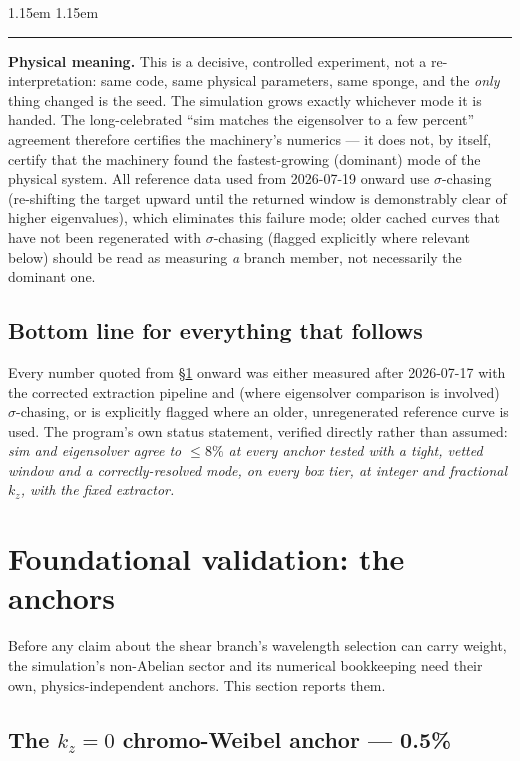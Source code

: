 \documentclass[11pt,a4paper]{article}
\numberwithin{equation}{section}
\theoremstyle{remark}
\newenvironment{physmeaning}%
{\par\medskip\noindent
 \begin{list}{}{\leftmargin 1.15em \rightmargin 1.15em \listparindent 0pt
 \itemindent 0pt \parsep 2pt \topsep 2pt}\item\relax
 \small\textcolor{meancol}{\rule[-0.6ex]{2.6pt}{2.4ex}}\hspace{0.55em}%
 \textcolor{meancol}{\textbf{Physical meaning.}}\hspace{0.5em}\ignorespaces}%
{\end{list}\medskip}
\newcommand{\kz}{k_z}
\begin{document}
\begin{physmeaning}
This is a decisive, controlled experiment, not a re-interpretation: same
code, same physical parameters, same sponge, and the \emph{only} thing
changed is the seed. The simulation grows exactly whichever mode it is
handed. The long-celebrated ``sim matches the eigensolver to a few
percent'' agreement therefore certifies the machinery's numerics — it
does not, by itself, certify that the machinery found the fastest-growing
(dominant) mode of the physical system. All reference data used from
2026-07-19 onward use $\sigma$-chasing (re-shifting the target upward
until the returned window is demonstrably clear of higher eigenvalues),
which eliminates this failure mode; older cached curves that have not
been regenerated with $\sigma$-chasing (flagged explicitly where relevant
below) should be read as measuring \emph{a} branch member, not necessarily
the dominant one.
\end{physmeaning}

\subsection{Bottom line for everything that follows}

Every number quoted from \S\ref{sec:validation} onward was either measured
after 2026-07-17 with the corrected extraction pipeline and (where
eigensolver comparison is involved) $\sigma$-chasing, or is explicitly
flagged where an older, unregenerated reference curve is used. The
program's own status statement, verified directly rather than assumed:
\emph{sim and eigensolver agree to $\le\!8\%$ at every anchor tested with a
tight, vetted window and a correctly-resolved mode, on every box tier, at
integer and fractional $\kz$, with the fixed extractor.}
\section{Foundational validation: the anchors}
\label{sec:validation}

Before any claim about the shear branch's wavelength selection can carry
weight, the simulation's non-Abelian sector and its numerical bookkeeping
need their own, physics-independent anchors. This section reports them.

\subsection{The $\kz=0$ chromo-Weibel anchor --- 0.5\%}
\label{ssec:weibelresult}
\end{document}
